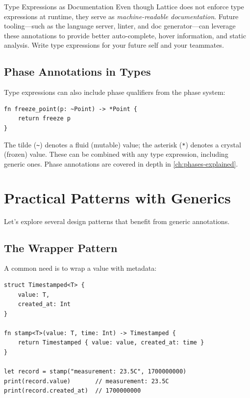 \begin{tipbox}{Type Expressions as Documentation}
Even though Lattice does not enforce type expressions at runtime, they serve
as \emph{machine-readable documentation}. Future tooling---such as the
language server, linter, and doc generator---can leverage these annotations
to provide better auto-complete, hover information, and static analysis.
Write type expressions for your future self and your teammates.
\end{tipbox}

\subsection{Phase Annotations in Types}

Type expressions can also include phase qualifiers from the phase system:

\begin{lstlisting}[language=Lattice, caption={Phase-annotated types}]
fn freeze_point(p: ~Point) -> *Point {
    return freeze p
}
\end{lstlisting}

The tilde (\lstinline|~|) denotes a fluid (mutable) value; the asterisk
(\lstinline|*|) denotes a crystal (frozen) value. These can be combined
with any type expression, including generic ones. Phase annotations are
covered in depth in \cref{ch:phases-explained}.

\section{Practical Patterns with Generics}\label{sec:generics-patterns}

Let's explore several design patterns that benefit from generic annotations.

\subsection{The Wrapper Pattern}

A common need is to wrap a value with metadata:

\begin{lstlisting}[language=Lattice, caption={A timestamped wrapper}]
struct Timestamped<T> {
    value: T,
    created_at: Int
}

fn stamp<T>(value: T, time: Int) -> Timestamped {
    return Timestamped { value: value, created_at: time }
}

let record = stamp("measurement: 23.5C", 1700000000)
print(record.value)       // measurement: 23.5C
print(record.created_at)  // 1700000000
\end{lstlisting}

